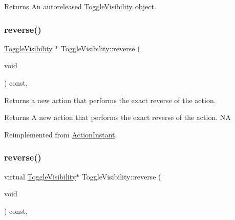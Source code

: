\begin{DoxyReturn}{Returns}
An autoreleased \hyperlink{classToggleVisibility}{Toggle\+Visibility} object. 
\end{DoxyReturn}
\mbox{\label{classToggleVisibility_a4904108887e11c98fd1d536bb76b2d35}} 
\subsubsection{\texorpdfstring{reverse()}{reverse()}\hspace{0.1cm}{\footnotesize\ttfamily [1/2]}}
{\footnotesize\ttfamily \hyperlink{classToggleVisibility}{Toggle\+Visibility} $\ast$ Toggle\+Visibility\+::reverse (\begin{DoxyParamCaption}\item[{void}]{ }\end{DoxyParamCaption}) const\hspace{0.3cm}{\ttfamily [override]}, {\ttfamily [virtual]}}

Returns a new action that performs the exact reverse of the action.

\begin{DoxyReturn}{Returns}
A new action that performs the exact reverse of the action.  NA 
\end{DoxyReturn}


Reimplemented from \hyperlink{classActionInstant_aeb1870802c509e1f4111c863a28e9262}{Action\+Instant}.

\mbox{\label{classToggleVisibility_aa406922563a2c5790e580653bc16c29e}} 
\subsubsection{\texorpdfstring{reverse()}{reverse()}\hspace{0.1cm}{\footnotesize\ttfamily [2/2]}}
{\footnotesize\ttfamily virtual \hyperlink{classToggleVisibility}{Toggle\+Visibility}$\ast$ Toggle\+Visibility\+::reverse (\begin{DoxyParamCaption}\item[{void}]{ }\end{DoxyParamCaption}) const\hspace{0.3cm}{\ttfamily [override]}, {\ttfamily [virtual]}}

